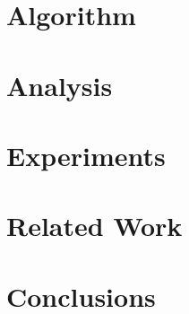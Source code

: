 \documentclass[letterpaper]{article} %
\begin{document}
\section{Algorithm}
\label{sec:algorithm}


\section{Analysis}
\label{sec:analysis}


\section{Experiments}
\label{sec:experiments}


\section{Related Work}
\label{sec:related work}


\section{Conclusions}
\label{sec:conclusions}


\newpage



\appendix

\end{document}
